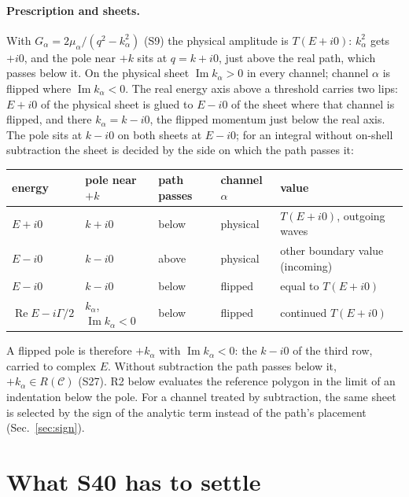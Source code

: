 \documentclass[11pt]{article}
\begin{document}
\paragraph{Prescription and sheets.} With $G_\alpha=2\mu_\alpha/(q^2-k_\alpha^2)$ (S9) the physical amplitude is $T(E+i0)$: $k_\alpha^2$ gets $+i0$, and the pole near $+k$ sits at $q=k+i0$, just above the real path, which passes below it. On the physical sheet $\operatorname{Im}k_\alpha>0$ in every channel; channel $\alpha$ is flipped where $\operatorname{Im}k_\alpha<0$. The real energy axis above a threshold carries two lips: $E+i0$ of the physical sheet is glued to $E-i0$ of the sheet where that channel is flipped, and there $k_\alpha=k-i0$, the flipped momentum just below the real axis. The pole sits at $k-i0$ on both sheets at $E-i0$; for an integral without on-shell subtraction the sheet is decided by the side on which the path passes it:
\begin{center}
\small
\setlength{\tabcolsep}{4pt}
\begin{tabular}{lllll}
\toprule
energy & pole near $+k$ & path passes & channel $\alpha$ & value\\
\midrule
$E+i0$ & $k+i0$ & below & physical & $T(E+i0)$, outgoing waves\\
$E-i0$ & $k-i0$ & above & physical & other boundary value (incoming)\\
$E-i0$ & $k-i0$ & below & flipped & equal to $T(E+i0)$\\
$\operatorname{Re}E-i\Gamma/2$ & $k_\alpha$, $\operatorname{Im}k_\alpha<0$ & below & flipped & continued $T(E+i0)$\\
\bottomrule
\end{tabular}
\end{center}
A flipped pole is therefore $+k_\alpha$ with $\operatorname{Im}k_\alpha<0$: the $k-i0$ of the third row, carried to complex $E$. Without subtraction the path passes below it, $+k_\alpha\in R(\mathcal C)$ (S27). R2 below evaluates the reference polygon in the limit of an indentation below the pole. For a channel treated by subtraction, the same sheet is selected by the sign of the analytic term instead of the path's placement (Sec.~\ref{sec:sign}).

\section{What S40 has to settle}
\end{document}
